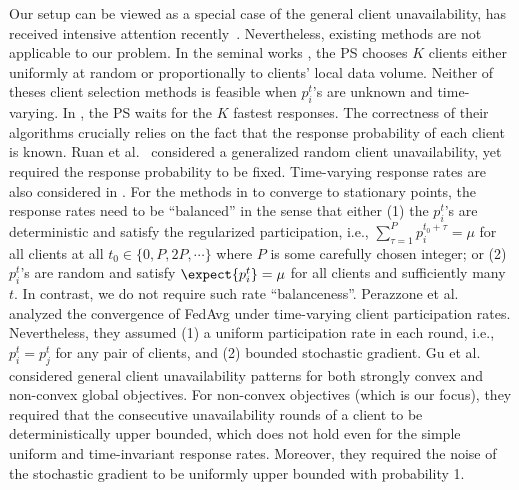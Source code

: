 \documentclass[letterpaper, 10 pt, conference]{ieeeconf}  %
\begin{document}
Our setup can be viewed as a special case of the general client unavailability, has received intensive attention recently~\cite{kairouz2021advances}. %
Nevertheless, existing methods are not applicable to our problem.  
In the seminal works \cite{mcmahan2017communication,Li2020}, the PS chooses $K$ clients either uniformly at random or proportionally to clients' local data volume. %
Neither of theses client selection methods is feasible when $p_i^t$'s are unknown and time-varying. 
In \cite{Li2020,philippenko2020bidirectional,kairouz2021advances,pmlr-v180-jhunjhunwala22a}, the PS waits for the $K$ fastest responses. The correctness of their algorithms crucially relies  on the fact that the response probability of each client is known.  
Ruan et al.~\cite{ruan2021towards} considered a generalized random client unavailability, yet required the response probability to be fixed. 
Time-varying response rates are also considered in \cite{wang2022, perazzone2022communication,gu2021fast}. 
For the methods in \cite{wang2022} to converge to stationary points, the response rates need to be ``balanced'' in the sense that 
either (1) the $p_i^t$'s are deterministic and satisfy the regularized participation, i.e., $\sum_{\tau=1}^P p_i^{t_0+\tau} =  \mu$ for all clients at all $t_0\in \{0, P, 2P, \cdots\}$ where $P$ is some carefully chosen integer; or (2) $p_i^t$'s are random and satisfy $\expect{p_i^t} = \mu$ for all clients and sufficiently many $t$.  In contrast, we do not require such rate ``balanceness''. 
Perazzone et al.\,\cite{perazzone2022communication} analyzed the convergence of {FedAvg} under time-varying client participation rates. Nevertheless, they assumed (1) a uniform participation rate in each round, i.e., $p_i^t = p_j^t$ for any pair of clients, and 
 (2) bounded stochastic gradient. 
Gu et al.\,\cite{gu2021fast} considered general client unavailability patterns for both strongly convex and non-convex global objectives. For non-convex objectives (which is our focus), they required that the consecutive unavailability rounds of a client to be deterministically upper bounded, which does not hold even for the simple uniform and time-invariant response rates. Moreover, they required the noise of the stochastic gradient to be uniformly upper bounded with probability 1. 
\end{document}
